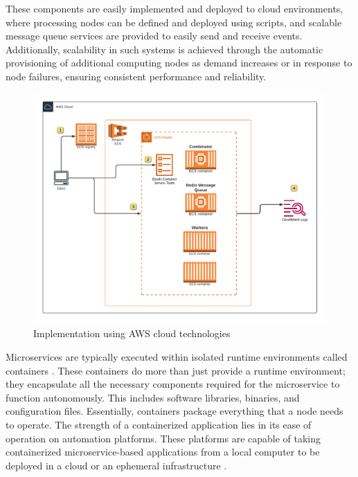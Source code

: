 \documentclass{cys}
\begin{document}
These components %
are easily implemented and deployed to cloud environments, where
processing nodes can be defined and deployed using scripts, %
and scalable message 
queue services are provided to easily send and receive events. Additionally, 
scalability in such systems is achieved through the automatic provisioning of 
additional computing nodes as demand increases or in response to node failures, 
ensuring consistent performance and reliability.

\begin{figure}[ht]
\centering
\includegraphics[width=\textwidth]{aws-deployment}
\caption{Implementation using AWS cloud technologies}
\label{fig:aws-deployment}
\end{figure}

Microservices are typically executed within isolated runtime environments called
containers \cite{liu2020microservices}. These containers do more than just
provide a runtime environment; they encapsulate all the necessary components
required for the microservice to function autonomously.  This includes software
libraries, binaries, and configuration files. Essentially, containers package
everything that a node needs to operate.  The strength of a containerized
application lies in its ease of operation on automation platforms.  These
platforms are capable of taking containerized microservice-based applications
from a local computer to be deployed in a cloud or an ephemeral infrastructure
\cite{gilbert2018cloud,kratzke2017understanding}.
\end{document}
